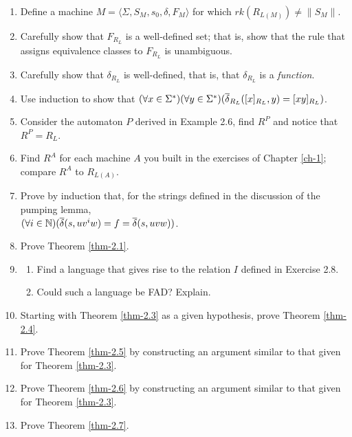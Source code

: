 \begin{enumerate}[{2.}1.]
\item Define a machine $M=\langle\Sigma,S_M,s_0,\delta,F_M\rangle$ for which
$rk(R_{L(M)}) \not= \|S_M\|$.

\item Carefully show that $F_{R_L}$ is a well-defined set; that is, show that
the rule that assigns equivalence classes to $F_{R_L}$ is unambiguous.

\item Carefully show that $\delta_{R_L}$ is well-defined, that is, that
$\delta_{R_L}$ is a \emph{function}.

\item Use induction to show that $(\forall x \in \Sigma^*)(\forall y \in
\Sigma^*)(\overline{\delta}_{R_L}([x]_{R_L},y) = [xy]_{R_L})$.

\item Consider the automaton $P$ derived in Example 2.6, find $R^P$ and notice
that $R^P = R_L$.

\item Find $R^A$ for each machine $A$ you built in the exercises of Chapter \ref{ch-1};
compare $R^A$ to $R_{L(A)}$.

\item Prove by induction that, for the strings defined in the discussion of
the pumping lemma,\\$(\forall i\in\mathbb{N})(\overline{\delta}(s,uv^iw) 	= f =\overline{\delta}(s,uvw))$.

\item Prove Theorem \ref{thm-2.1}.

\item \begin{enumerate}
\item Find a language that gives rise to the relation $I$ defined in Exercise
2.8.
\item Could such a language be FAD? Explain.
\end{enumerate}

\item Starting with Theorem \ref{thm-2.3} as a given hypothesis, prove Theorem \ref{thm-2.4}.

\item Prove Theorem \ref{thm-2.5} by constructing an argument similar to that given for
Theorem \ref{thm-2.3}.

\item Prove Theorem \ref{thm-2.6} by constructing an argument similar to that given for
Theorem \ref{thm-2.3}.

\item Prove Theorem \ref{thm-2.7}.


\end{enumerate}
